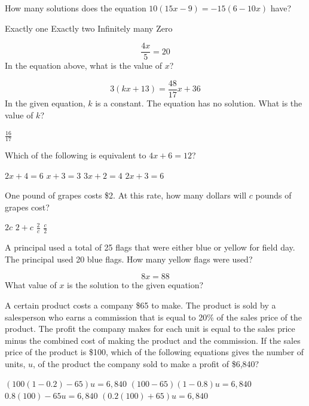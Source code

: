 \question[1]
How many solutions does the equation $10(15x-9)=-15(6-10x)$ have?
\begin{choices}
  \choice Exactly one
  \choice Exactly two
  \CorrectChoice Infinitely many
  \choice Zero
\end{choices}

\newpage


\question[1]
\[
  \frac{4x}{5}=20
\]
In the equation above, what is the value of $x$?
\begin{choices}
\end{choices}

\question[1]
\[3(kx+13)=\frac{48}{17}x+36\]
In the given equation, $k$ is a constant. The equation has no solution. What is the value of $k$?
\begin{solution}
$\frac{16}{17}$
\end{solution}

\question[1]
Which of the following is equivalent to $4x+6=12$?
\begin{choices}
  \choice $2x+4=6$
  \choice $x+3=3$
  \choice $3x+2=4$
  \CorrectChoice $2x+3=6$
\end{choices}



\newpage



\question[1]
One pound of grapes costs \$2. At this rate, how many dollars will $c$ pounds of grapes cost?
\begin{choices}
  \CorrectChoice $2c$
  \choice $2+c$
  \choice $\frac{2}{c}$
  \choice $\frac{c}{2}$
\end{choices}

\question[1]
A principal used a total of 25 flags that were either blue or yellow for field day. The principal used 20 blue flags. How many yellow flags were used?
\begin{choices}
\end{choices}

\question[1]
\[8x=88\]
What value of $x$ is the solution to the given equation?
\begin{choices}
\end{choices}




\newpage



\question[1]
A certain product costs a company \$65 to make. The product is sold by a salesperson who earns a commission that is equal to 20\% of the sales price of the product. The profit the company makes for each unit is equal to the sales price minus the combined cost of making the product and the commission. If the sales price of the product is \$100, which of the following equations gives the number of units, $u$, of the product the company sold to make a profit of \$6,840?
\begin{choices}
  \CorrectChoice $(100(1-0.2)-65)u=6,840$
  \choice $(100-65)(1-0.8)u=6,840$
  \choice $0.8(100)-65u=6,840$
  \choice $(0.2(100)+65)u=6,840$
\end{choices}

